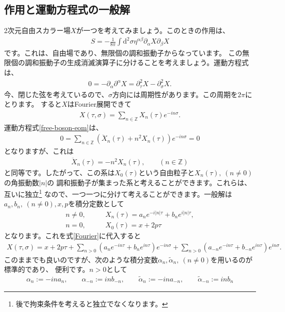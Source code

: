 \documentclass[report,paper=a4, fontsize=12pt, line_length=16cm, number_of_lines=33,dvipdfmx]{jlreq}
\numberwithin{equation}{chapter}
\numberwithin{equation}{section}
\newcommand{\Zb}{\mathbb{Z}}
\newcommand{\del}{\partial}
\newcommand{\alphat}{\tilde{\alpha}}
\newcommand{\di}{\mathrm{d}}
\begin{document}
\subsection{作用と運動方程式の一般解}
2次元自由スカラー場$X$が一つを考えてみましょう。このときの作用は、
\begin{align}
S=-\frac{1}{8\pi}\int \di^2\sigma \eta^{\alpha\beta}\del_{\alpha} X \del_{\beta} X
\label{free-boson-action}
\end{align}
です。これは、自由場であり、無限個の調和振動子からなっています。
この無限個の調和振動子の生成消滅演算子に分けることを考えましょう。運動方程式は、
\begin{align}
0=-\del_{\alpha}\del^{\alpha}X=\del_{\tau}^2 X-\del_{\sigma}^2 X.
\label{free-boson-eom}
\end{align}
今、閉じた弦を考えているので、$\sigma$方向には周期性があります。この周期を$2\pi$にとります。
すると$X$はFourier展開できて
\begin{align}
  X(\tau,\sigma)=\sum_{n\in \Zb} X_n(\tau)e^{-in\sigma}. \label{Fourier}
\end{align}
運動方程式\eqref{free-boson-eom}は、
\begin{align}
  0=\sum_{n\in \Zb} (\ddot{X}_{n}(\tau)+n^2 X_{n}(\tau))e^{-in\sigma}=0
\end{align}
となりますが、これは
\begin{align}
\ddot{X}_n(\tau)=-n^2 X_n(\tau),\qquad (n\in \Zb)
\end{align}
と同等です。したがって、この系は$X_0(\tau)$という自由粒子と$X_{n}(\tau),\ (n\ne 0)$ の角振動数$|n|$の
調和振動子が集まった系と考えることができます。これらは、互いに独立\footnote{後で拘束条件を考えると独立でなくなります。}
なので、一つ一つに分けて考えることができます。一般解は$a_n, b_n, \ (n\ne0),x, p$を積分定数として
\begin{align}
n\ne 0,\qquad & X_{n}(\tau)=a_n e^{-i|n|\tau}+b_n e^{i|n|\tau},\\
n = 0,\qquad & X_{0}(\tau)=x+2p\tau
\end{align}
となります。これを式\eqref{Fourier}に代入すると
\begin{align}
X(\tau,\sigma)=
x+2p\tau
+\sum_{n>0} (a_ne^{-in\tau}+b_n e^{in\tau})e^{-in\sigma}
+\sum_{n>0} (a_{-n}e^{-in\tau}+b_{-n}e^{in\tau})e^{in\sigma}.
\end{align}
このままでも良いのですが、次のような積分変数$\alpha_n,\alphat_n,\ (n\ne 0)$を用いるのが標準的であり、
便利です。$n>0$として
\begin{align}
\alpha_n:=-ina_n,\qquad \alpha_{-n}:=inb_{-n},\qquad
\alphat_n:=-in a_{-n},\qquad \alphat_{-n}:=inb_{n}
\end{align}
\end{document}
